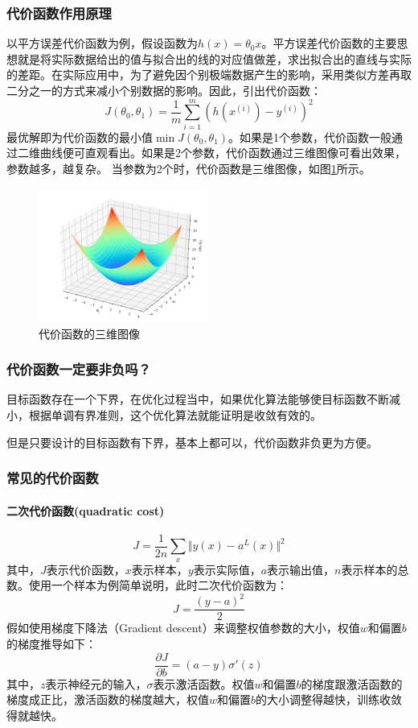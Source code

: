 \documentclass[UTF8]{ctexart}
\begin{document}
\subsubsection{代价函数作用原理}
以平方误差代价函数为例，假设函数为$h(x)=\theta_0x$。平方误差代价函数的主要思想就是将实际数据给出的值与拟合出的线的对应值做差，求出拟合出的直线与实际的差距。在实际应用中，为了避免因个别极端数据产生的影响，采用类似方差再取二分之一的方式来减小个别数据的影响。因此，引出代价函数：
$$J(\theta_0, \theta_1) = \frac{1}{m}\sum_{i=1}^m(h(x^{(i)})-y^{(i)})^2$$
最优解即为代价函数的最小值$\min J(\theta_0, \theta_1)$。如果是1个参数，代价函数一般通过二维曲线便可直观看出。如果是2个参数，代价函数通过三维图像可看出效果，参数越多，越复杂。
当参数为2个时，代价函数是三维图像，如图\ref{costfunction1}所示。
\begin{figure}[htb]
	\centering
	\includegraphics[width=0.5\textwidth]{figures/costfunction1.jpg}
	\caption{代价函数的三维图像}
	\label{costfunction1}
\end{figure}
\subsubsection{代价函数一定要非负吗？}
目标函数存在一个下界，在优化过程当中，如果优化算法能够使目标函数不断减小，根据单调有界准则，这个优化算法就能证明是收敛有效的。
\par 但是只要设计的目标函数有下界，基本上都可以，代价函数非负更为方便。
\subsubsection{常见的代价函数}
\paragraph{二次代价函数(quadratic cost)}
$$J = \frac{1}{2n}\sum_x\Vert y(x)-a^L(x)\Vert^2$$
其中，$J$表示代价函数，$x$表示样本，$y$表示实际值，$a$表示输出值，$n$表示样本的总数。使用一个样本为例简单说明，此时二次代价函数为：
$$J = \frac{(y-a)^2}{2}$$
假如使用梯度下降法（Gradient descent）来调整权值参数的大小，权值$w$和偏置$b$的梯度推导如下：
$$\frac{\partial J}{\partial b}=(a-y)\sigma'(z)$$
其中，$z​$表示神经元的输入，$\sigma​$表示激活函数。权值$w​$和偏置$b​$的梯度跟激活函数的梯度成正比，激活函数的梯度越大，权值$w​$和偏置$b​$的大小调整得越快，训练收敛得就越快。
\end{document}
